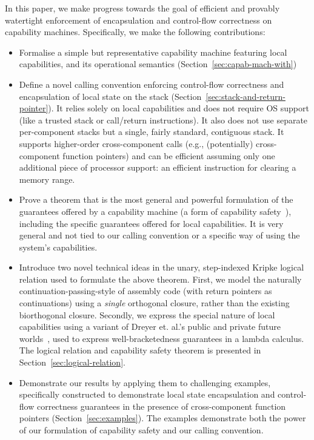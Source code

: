 \documentclass[compsoc,conference,letterpaper,fleqn]{IEEEtran}
\newcommand\lau[1]{{\color{purple} \sf \footnotesize {LS: #1}}\\}
\begin{document}
In this paper, we make progress towards the goal of efficient and provably
watertight enforcement of encapsulation and control-flow correctness on
capability machines. Specifically, we make the following contributions:
\begin{itemize}
\item Formalise a simple but representative capability machine featuring local
  capabilities, and its operational semantics
  (Section~\ref{sec:capab-mach-with})
\item Define a novel calling convention enforcing control-flow correctness and
  encapsulation of local state on the stack
  (Section~\ref{sec:stack-and-return-pointer}). It relies solely on local
  capabilities and does not require OS support (like a trusted stack or
  call/return instructions). It also does not use separate per-component stacks
  but a single, fairly standard, contiguous stack. It supports higher-order
  cross-component calls (e.g., (potentially) cross-component function pointers)
  and can be efficient assuming only one additional piece of processor support:
  an efficient instruction for clearing a memory range.
\item Prove a theorem that is the most general and powerful formulation of the
  guarantees offered by a capability machine (a form of capability
  safety~\cite{Devriese:2016ObjCap,Maffeis2010OC}), including the specific
  guarantees offered for local capabilities. It is very general and not tied to
  our calling convention or a specific way of using the system's capabilities.
\item Introduce two novel technical ideas in the unary, step-indexed Kripke
  logical relation used to formulate the above theorem. First, we model the
  naturally continuation-passing-style of assembly code (with return pointers as
  continuations) using a \emph{single} orthogonal closure, rather than the
  existing biorthogonal closure. Secondly, we express the special nature of
  local capabilities using a variant of Dreyer et. al.'s public and private
  future worlds~\citep{Dreyer:jfp12}, used to express well-bracketedness
  guarantees in a lambda calculus. The logical relation and capability safety
  theorem is presented in Section~\ref{sec:logical-relation}.
\item Demonstrate our results by applying them to challenging examples,
  specifically constructed to demonstrate local state encapsulation and
  control-flow correctness guarantees in the presence of cross-component
  function pointers (Section~\ref{sec:examples}). The examples demonstrate both
  the power of our formulation of capability safety and our calling convention.
\end{itemize}
\end{document}
